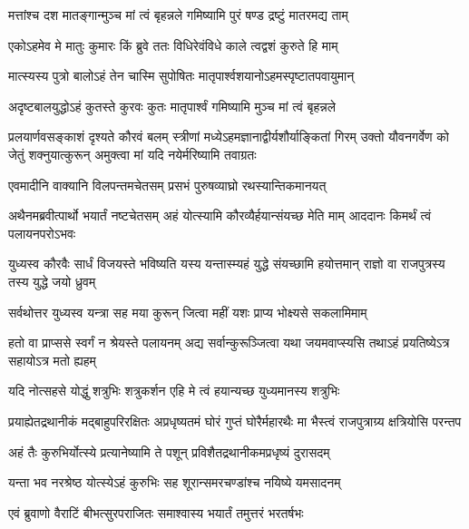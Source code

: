 \twolineshloka
{मत्तांश्च दश मातङ्गान्मुञ्च मां त्वं बृहन्नले}
{गमिष्यामि पुरं षण्ड द्रष्टुं मातरमद्य ताम्}


\twolineshloka
{एकोऽहमेव मे मातुः कुमारः किं ब्रुवे ततः}
{विधिरेवंविधे काले त्वद्वशं कुरुते हि माम्}


\twolineshloka
{मात्स्यस्य पुत्रो बालोऽहं तेन चास्मि सुपोषितः}
{मातृपार्श्वशयानोऽहमस्पृष्टातपवायुमान्}


\twolineshloka
{अदृष्टबालयुद्धोऽहं कुतस्ते कुरवः कुतः}
{मातृपार्श्वं गमिष्यामि मुञ्च मां त्वं बृहन्नले}


\onelineshloka
{प्रलयार्णवसङ्काशं दृश्यते कौरवं बलम्}
\threelineshloka
{स्त्रीणां मध्येऽहमज्ञानाद्वीर्यशौर्याङ्कितां गिरम्}
{उक्तो यौवनगर्वेण को जेतुं शक्नुयात्कुरून्}
{अमुक्त्वा मां यदि नयेर्मरिष्यामि तवाग्रतः}



\twolineshloka
{एवमादीनि वाक्यानि विलपन्तमचेतसम्}
{प्रसभं पुरुषव्याघ्रो रथस्यान्तिकमानयत्}


\onelineshloka
{अथैनमब्रवीत्पार्थो भयार्तं नष्टचेतसम्}
\twolineshloka
{अहं योत्स्यामि कौरव्यैर्हयान्संयच्छ मेति माम्}
{आददानः किमर्थं त्वं पलायनपरोऽभवः}


\threelineshloka
{युध्यस्व कौरवैः सार्धं विजयस्ते भविष्यति}
{यस्य यन्तास्म्यहं युद्धे संयच्छामि हयोत्तमान्}
{राज्ञो वा राजपुत्रस्य तस्य युद्धे जयो ध्रुवम्}


\twolineshloka
{सर्वथोत्तर युध्यस्व यन्त्रा सह मया कुरून्}
{जित्वा महीं यशः प्राप्य भोक्ष्यसे सकलामिमाम्}


\onelineshloka
{हतो वा प्राप्ससे स्वर्गं न श्रेयस्ते पलायनम्}
\twolineshloka
{अद्य सर्वान्कुरूञ्जित्वा यथा जयमवाप्स्यसि}
{तथाऽहं प्रयतिष्येऽत्र सहायोऽत्र मतो ह्यहम्}


\twolineshloka
{यदि नोत्सहसे योद्धुं शत्रुभिः शत्रुकर्शन}
{एहि मे त्वं हयान्यच्छ युध्यमानस्य शत्रुभिः}


\threelineshloka
{प्रयाह्येतद्रथानीकं मद्बाहुपरिरक्षितः}
{अप्रधृष्यतमं घोरं गुप्तं घोरैर्महारथैः}
{मा भैस्त्वं राजपुत्राग्र्य क्षत्रियोसि परन्तप}


\twolineshloka
{अहं तैः कुरुभिर्योत्स्ये प्रत्यानेष्यामि ते पशून्}
{प्रविशैतद्रथानीकमप्रधृष्यं दुरासदम्}


\twolineshloka
{यन्ता भव नरश्रेष्ठ योत्स्येऽहं कुरुभिः सह}
{शूरान्समरचण्डांश्च नयिष्ये यमसादनम्}



\twolineshloka
{एवं ब्रुवाणो वैराटिं बीभत्सुरपराजितः}
{समाश्वास्य भयार्तं तमुत्तरं भरतर्षभः}


